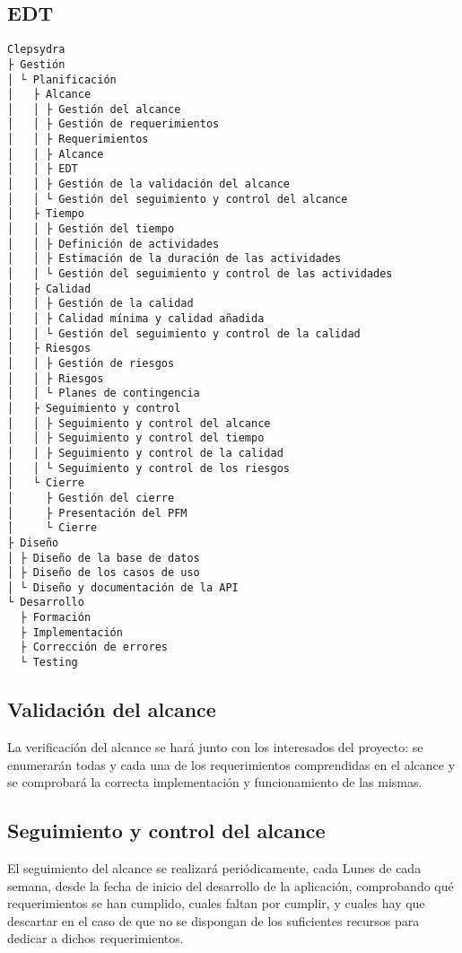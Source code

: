 \subsection{EDT}
\begin{verbatim}
Clepsydra
├ Gestión
│ └ Planificación
│   ├ Alcance
│   │ ├ Gestión del alcance
│   │ ├ Gestión de requerimientos
│   │ ├ Requerimientos
│   │ ├ Alcance
│   │ ├ EDT
│   │ ├ Gestión de la validación del alcance
│   │ └ Gestión del seguimiento y control del alcance
│   ├ Tiempo
│   │ ├ Gestión del tiempo
│   │ ├ Definición de actividades
│   │ ├ Estimación de la duración de las actividades
│   │ └ Gestión del seguimiento y control de las actividades
│   ├ Calidad
│   │ ├ Gestión de la calidad
│   │ ├ Calidad mínima y calidad añadida
│   │ └ Gestión del seguimiento y control de la calidad
│   ├ Riesgos
│   │ ├ Gestión de riesgos
│   │ ├ Riesgos
│   │ └ Planes de contingencia
│   ├ Seguimiento y control
│   │ ├ Seguimiento y control del alcance
│   │ ├ Seguimiento y control del tiempo
│   │ ├ Seguimiento y control de la calidad
│   │ └ Seguimiento y control de los riesgos
│   └ Cierre
│     ├ Gestión del cierre
│     ├ Presentación del PFM
│     └ Cierre
├ Diseño
│ ├ Diseño de la base de datos
│ ├ Diseño de los casos de uso
│ └ Diseño y documentación de la API
└ Desarrollo
  ├ Formación
  ├ Implementación
  ├ Corrección de errores
  └ Testing
\end{verbatim}

\subsection{Validación del alcance}
La verificación del alcance se hará junto con los interesados del proyecto:
se enumerarán todas y cada una de los requerimientos comprendidas en el alcance
y se comprobará la correcta implementación y funcionamiento de las mismas.

\subsection{Seguimiento y control del alcance}
El seguimiento del alcance se realizará periódicamente, cada Lunes de cada
semana, desde la fecha de inicio del desarrollo de la aplicación, comprobando
qué requerimientos se han cumplido, cuales faltan por cumplir, y cuales hay
que descartar en el caso de que no se dispongan de los suficientes recursos
para dedicar a dichos requerimientos.
